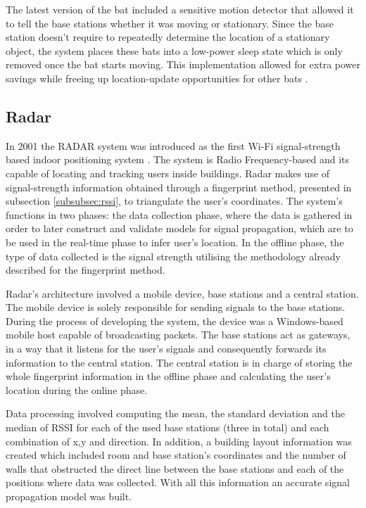   
The latest version of the bat included a sensitive motion detector that allowed it to tell the base stations whether it was moving or stationary. Since the base station doesn't require to repeatedly determine the location of a stationary object, the system places these bats into a low-power sleep state which is only removed once the bat starts moving. This implementation allowed for extra power savings while freeing up location-update opportunities for other bats \cite{bat2}.  
  
  
\subsection{Radar}  
\label{subsec:radar}  
  
  
In 2001 the RADAR system was introduced as the first Wi-Fi signal-strength based indoor positioning system \cite{radar}. The system is Radio Frequency-based and its capable of locating and tracking users inside buildings. Radar makes use of signal-strength information obtained through a fingerprint method, presented in subsection \ref{subsubsec:rssi}, to triangulate the user's coordinates. The system's functions in two phases: the data collection phase, where the data is gathered in order to later construct and validate models for signal propagation, which are to be used in the real-time phase to infer user's location. In the offline phase, the type of data collected is the signal strength utilising the methodology already described for the fingerprint method.  
  
  
Radar's architecture involved a mobile device, base stations and a central station. The mobile device is solely responsible for sending signals to the base stations. During the process of developing the system, the device was a Windows-based mobile host capable of broadcasting packets. The base stations act as gateways, in a way that it listens for the user's signals and consequently forwards its information to the central station. The central station is in charge of storing the whole fingerprint information in the offline phase and calculating the user's location during the online phase.  
  
  
Data processing involved computing the mean, the standard deviation and the median of \ac{RSSI} for each of the used base stations (three in total) and each combination of x,y and direction. In addition, a building layout information was created which included room and base station's coordinates and the number of walls that obstructed the direct line between the base stations and each of the positions where data was collected. With all this information an accurate signal propagation model was built.  
  

